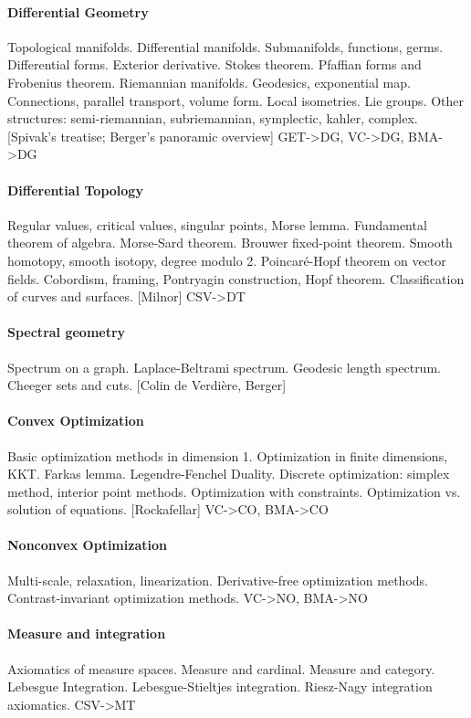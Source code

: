 \paragraph{Differential Geometry}
Topological manifolds.
Differential manifolds.
Submanifolds, functions, germs.
Differential forms.
Exterior derivative.
Stokes theorem.
Pfaffian forms and Frobenius theorem.
Riemannian manifolds.  Geodesics, exponential map.
Connections, parallel transport, volume form.
Local isometries.  Lie groups.
Other structures: semi-riemannian, subriemannian, symplectic, kahler, complex.
[Spivak's treatise; Berger's panoramic overview]
{GET->DG, VC->DG, BMA->DG}

\paragraph{Differential Topology}
Regular values, critical values, singular points, Morse lemma.
Fundamental theorem of algebra.
Morse-Sard theorem.
Brouwer fixed-point theorem.
Smooth homotopy, smooth isotopy, degree modulo 2.
Poincaré-Hopf theorem on vector fields.
Cobordism, framing, Pontryagin construction, Hopf theorem.
Classification of curves and surfaces.
[Milnor]
{CSV->DT}

\paragraph{Spectral geometry}
Spectrum on a graph.
Laplace-Beltrami spectrum.
Geodesic length spectrum.
Cheeger sets and cuts.
[Colin de Verdière, Berger]


\paragraph{Convex Optimization}
Basic optimization methods in dimension 1.
Optimization in finite dimensions, KKT.
Farkas lemma.
Legendre-Fenchel Duality.
Discrete optimization: simplex method, interior point methods.
Optimization with constraints.
Optimization vs. solution of equations.
[Rockafellar]
{VC->CO, BMA->CO}

\paragraph{Nonconvex Optimization}
Multi-scale, relaxation, linearization.
Derivative-free optimization methods.
Contrast-invariant optimization methods.
{VC->NO, BMA->NO}

\paragraph{Measure and integration}
Axiomatics of measure spaces.
Measure and cardinal.
Measure and category.
Lebesgue Integration.
Lebesgue-Stieltjes integration.
Riesz-Nagy integration axiomatics.
{CSV->MT}

